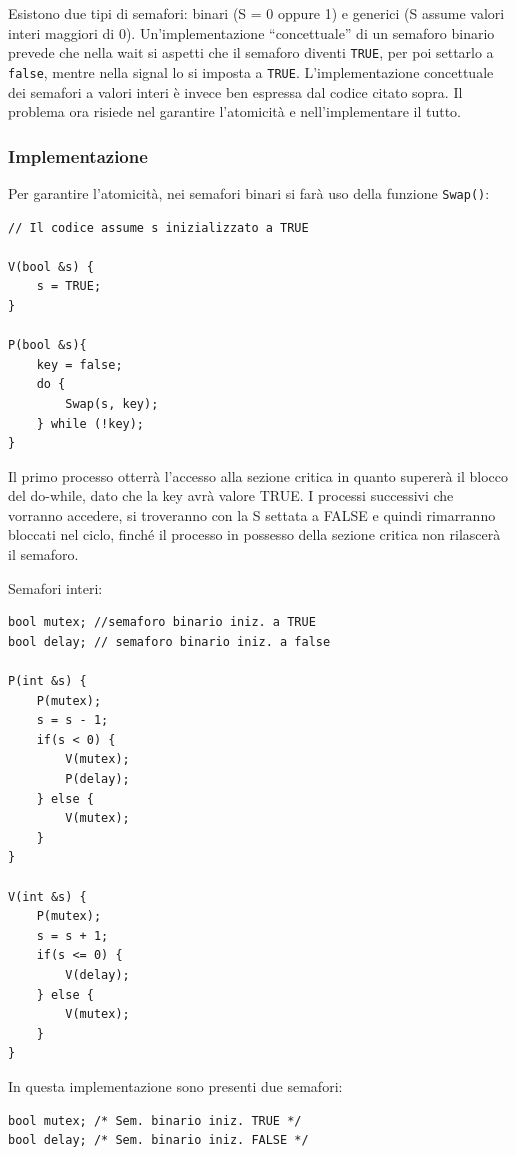 \documentclass[a4paper]{article}
\begin{document}
Esistono due tipi di semafori: binari (S = 0 oppure 1) e generici (S assume valori interi maggiori di 0). Un'implementazione ``concettuale'' di un semaforo binario prevede che nella wait si aspetti che il semaforo diventi \texttt{TRUE}, per poi settarlo a \texttt{false}, mentre nella signal lo si imposta a \texttt{TRUE}. L'implementazione concettuale dei semafori a valori interi è invece ben espressa dal codice citato sopra. \newline
Il problema ora risiede nel garantire l'atomicità e nell'implementare il tutto.

\subsubsection{Implementazione}
Per garantire l'atomicità, nei semafori binari si farà uso della funzione \texttt{Swap()}:
\begin{verbatim}
// Il codice assume s inizializzato a TRUE

V(bool &s) {
    s = TRUE;
} 

P(bool &s){                                            
    key = false;
    do {                                                       
        Swap(s, key);
    } while (!key);
}
\end{verbatim}
Il primo processo otterrà l'accesso alla sezione critica in quanto supererà il blocco del do-while, dato che la key avrà valore TRUE. I processi successivi che vorranno accedere, si troveranno con la S settata a FALSE e quindi rimarranno bloccati nel ciclo, finché il processo in possesso della sezione critica non rilascerà il semaforo.

Semafori interi:
\begin{verbatim}
bool mutex; //semaforo binario iniz. a TRUE
bool delay; // semaforo binario iniz. a false

P(int &s) {
    P(mutex);
    s = s - 1;
    if(s < 0) {
        V(mutex);
        P(delay);
    } else {
        V(mutex);
    }
}

V(int &s) {
    P(mutex);
    s = s + 1;
    if(s <= 0) {
        V(delay);
    } else {
        V(mutex);
    }
}
\end{verbatim}

In questa implementazione sono presenti due semafori:

\begin{verbatim}
bool mutex; /* Sem. binario iniz. TRUE */
bool delay; /* Sem. binario iniz. FALSE */
\end{verbatim}
\end{document}
